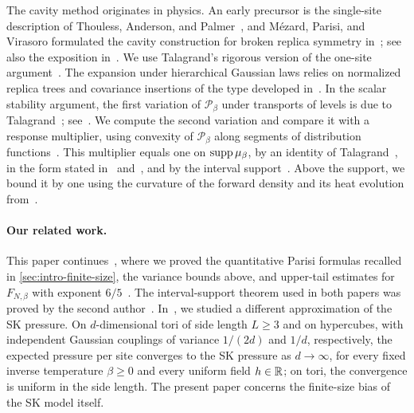 The cavity method originates in physics. An early precursor is the
single-site description of Thouless, Anderson, and
Palmer~\cite[Section~3, Eqs.~(10)--(12)]{ThoulessAndersonPalmer1977},
and M\'ezard, Parisi, and
Virasoro formulated the cavity construction for broken replica symmetry
in~\cite{MezardParisiVirasoro1986}; see also the exposition
in~\cite{MezardParisiVirasoro1987}. We use Talagrand's rigorous version
of the one-site argument~\cite[Section~1.6]{TalagrandVolI2011}. The
expansion under hierarchical Gaussian laws relies on normalized replica
trees and covariance insertions of the type developed
in~\cite[Section~2]{OpenAIFluctuationScale}. In the scalar stability
argument, the first variation of $\mathcal P_\beta$ under transports of
levels is due to Talagrand~\cite[Lemma~3.7]{Talagrand2006ParisiMeasures};
see~\cite[Section~3, (19)]{AuffingerChen2015Properties}. We compute the
second variation and compare it with a response multiplier, using
convexity of $\mathcal P_\beta$ along segments of distribution
functions~\cite{AuffingerChen2015Uniqueness}. This multiplier equals one
on $\operatorname{supp}\mu_\beta$, by an identity of
Talagrand~\cite{Talagrand2006ParisiMeasures}, in the form stated
in~\cite[Theorem~5]{AuffingerChen2015Properties}
and~\cite[Lemma~2.6]{Lopatto}, and by the interval
support~\cite[Theorem~1.1]{Lopatto}. Above the support, we bound it by one
using the curvature of the forward density and its heat evolution
from~\cite[Proposition~4.1 and Lemma~2.4(ii)]{Lopatto}.

\paragraph{Our related work.}
This paper continues~\cite{AL}, where we proved the quantitative Parisi
formulas recalled in \cref{sec:intro-finite-size}, the variance bounds
above, and upper-tail estimates for $F_{N,\beta}$ with exponent
$6/5$~\cite[Theorem~1.5]{AL}. The interval-support theorem used in both
papers was proved by the second author~\cite{Lopatto}.
In~\cite{AronowLopatto2026EA}, we studied a different approximation of
the SK pressure. On $d$-dimensional tori of side length $L\ge3$ and on
hypercubes, with independent Gaussian couplings of variance $1/(2d)$
and $1/d$, respectively, the expected pressure per site converges to the
SK pressure as $d\to\infty$, for every fixed inverse temperature
$\beta\ge0$ and every uniform field $h\in\mathbb R$; on tori, the convergence
is uniform in the side length. The present paper concerns the
finite-size bias of the SK model itself.

